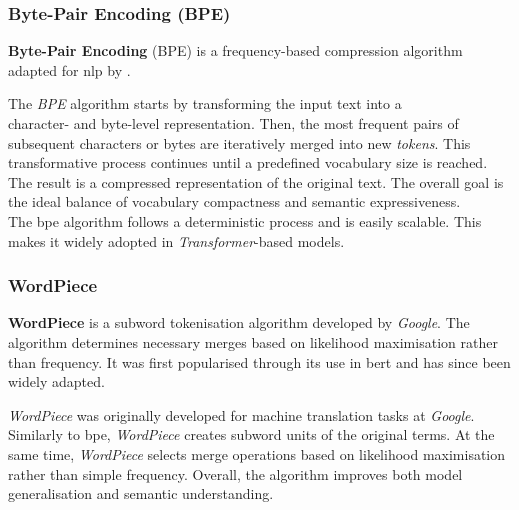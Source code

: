 \subsubsection{Byte-Pair Encoding (BPE)}
\begin{definition}
    \textbf{Byte-Pair Encoding} (BPE) is a frequency-based compression algorithm adapted for \ac{nlp} by \citet{sennrich2016neural}. 
\end{definition}
%
The \textit{BPE} algorithm starts by transforming the input text into a\\ character- and byte-level representation.
Then, the most frequent pairs of subsequent characters or bytes are iteratively merged into new \textit{tokens}.
This transformative process continues until a predefined vocabulary size is reached.
The result is a compressed representation of the original text.
The overall goal is the ideal balance of vocabulary compactness and semantic expressiveness.\\
%
The \ac{bpe} algorithm follows a deterministic process and is easily scalable.
This makes it widely adopted in \textit{Transformer}-based models.

\subsubsection{WordPiece}
\begin{definition}
    \textbf{WordPiece} is a subword tokenisation algorithm developed by \textit{Google}.
    The algorithm determines necessary merges based on likelihood maximisation rather than frequency. It was first popularised through its use in \ac{bert} \citep{devlin2019bert} and has since been widely adapted.
\end{definition}
\textit{WordPiece} was originally developed for machine translation tasks at \textit{Google}.
Similarly to \ac{bpe}, \textit{WordPiece} creates subword units of the original terms.
At the same time, \textit{WordPiece} selects merge operations based on likelihood maximisation rather than simple frequency.
Overall, the algorithm improves both model generalisation and semantic understanding.
%

